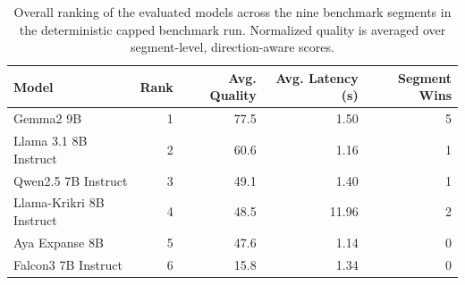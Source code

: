 \begin{table}[t]
\centering
\caption{Overall ranking of the evaluated models across the nine benchmark segments in the deterministic capped benchmark run. Normalized quality is averaged over segment-level, direction-aware scores.}
\label{tab:capped-overall-ranking}
\begin{tabular}{lrrrr}
\toprule
Model & Rank & Avg. Quality & Avg. Latency (s) & Segment Wins \\
\midrule
Gemma2 9B & 1 & 77.5 & 1.50 & 5 \\
Llama 3.1 8B Instruct & 2 & 60.6 & 1.16 & 1 \\
Qwen2.5 7B Instruct & 3 & 49.1 & 1.40 & 1 \\
Llama-Krikri 8B Instruct & 4 & 48.5 & 11.96 & 2 \\
Aya Expanse 8B & 5 & 47.6 & 1.14 & 0 \\
Falcon3 7B Instruct & 6 & 15.8 & 1.34 & 0 \\
\bottomrule
\end{tabular}
\end{table}
